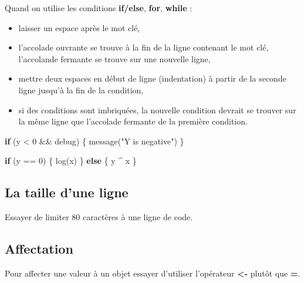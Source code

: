 \documentclass[
]{book}
\newenvironment{Shaded}{\begin{snugshade}}{\end{snugshade}}
\newcommand{\ControlFlowTok}[1]{\textcolor[rgb]{0.13,0.29,0.53}{\textbf{#1}}}
\newcommand{\DecValTok}[1]{\textcolor[rgb]{0.00,0.00,0.81}{#1}}
\newcommand{\FunctionTok}[1]{\textcolor[rgb]{0.00,0.00,0.00}{#1}}
\newcommand{\NormalTok}[1]{#1}
\newcommand{\SpecialCharTok}[1]{\textcolor[rgb]{0.00,0.00,0.00}{#1}}
\newcommand{\StringTok}[1]{\textcolor[rgb]{0.31,0.60,0.02}{#1}}
\theoremstyle{definition}
\theoremstyle{definition}
\theoremstyle{definition}
\theoremstyle{definition}
\theoremstyle{remark}
\begin{document}
Quand on utilise les conditions \textbf{if/else}, \textbf{for}, \textbf{while} :

\begin{itemize}
\item
  laisser un espace après le mot clé,
\item
  l'accolade ouvrante se trouve à la fin de la ligne contenant le mot clé, l'accolande fermante se trouve sur une nouvelle ligne,
\item
  mettre deux espaces en début de ligne (indentation) à partir de la seconde ligne jusqu'à la fin de la condition,
\item
  si des conditions sont imbriquées, la nouvelle condition devrait se trouver sur la même ligne que l'accolade fermante de la première condition.
\end{itemize}

\begin{Shaded}
\begin{Highlighting}[]
\ControlFlowTok{if}\NormalTok{ (y }\SpecialCharTok{\textless{}} \DecValTok{0} \SpecialCharTok{\&\&}\NormalTok{ debug) \{}
  \FunctionTok{message}\NormalTok{(}\StringTok{"Y is negative"}\NormalTok{)}
\NormalTok{\}}
\end{Highlighting}
\end{Shaded}

\begin{Shaded}
\begin{Highlighting}[]
\ControlFlowTok{if}\NormalTok{ (y }\SpecialCharTok{==} \DecValTok{0}\NormalTok{) \{}
  \FunctionTok{log}\NormalTok{(x)}
\NormalTok{\} }\ControlFlowTok{else}\NormalTok{ \{}
\NormalTok{  y }\SpecialCharTok{\^{}}\NormalTok{ x}
\NormalTok{\}}
\end{Highlighting}
\end{Shaded}

\hypertarget{la-taille-dune-ligne}{%
\subsection{La taille d'une ligne}\label{la-taille-dune-ligne}}

Essayer de limiter 80 caractères à une ligne de code.

\hypertarget{affectation}{%
\subsection{Affectation}\label{affectation}}

Pour affecter une valeur à un objet essayer d'utiliser l'opérateur \textbf{\textless-} plutôt que \textbf{=}.
\end{document}
